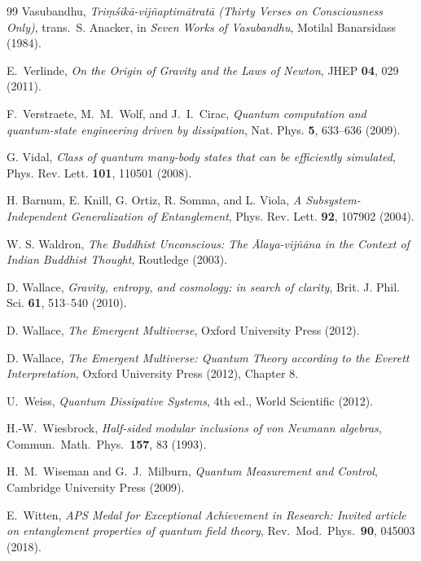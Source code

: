 \documentclass[12pt,a4paper,openany]{book}
\begin{document}
\begin{thebibliography}{99}
Vasubandhu, \emph{Triṃśikā-vijñaptimātratā (Thirty Verses on Consciousness Only)}, trans.\ S. Anacker, in \emph{Seven Works of Vasubandhu}, Motilal Banarsidass (1984).


E.~Verlinde, \emph{On the Origin of Gravity and the Laws of Newton}, JHEP \textbf{04}, 029 (2011).

F.~Verstraete, M.~M.~Wolf, and J.~I.~Cirac, \emph{Quantum computation and quantum-state engineering driven by dissipation}, Nat. Phys. \textbf{5}, 633--636 (2009).

G. Vidal, \emph{Class of quantum many-body states that can be efficiently simulated}, Phys. Rev. Lett. \textbf{101}, 110501 (2008).

H. Barnum, E. Knill, G. Ortiz, R. Somma, and L. Viola, \emph{A Subsystem-Independent Generalization of Entanglement}, Phys. Rev. Lett. \textbf{92}, 107902 (2004).

W. S. Waldron, \emph{The Buddhist Unconscious: The Ālaya-vijñāna in the Context of Indian Buddhist Thought}, Routledge (2003).

D. Wallace, \emph{Gravity, entropy, and cosmology: in search of clarity}, Brit. J. Phil. Sci. \textbf{61}, 513--540 (2010).

D. Wallace, \emph{The Emergent Multiverse}, Oxford University Press (2012).

D. Wallace, \emph{The Emergent Multiverse: Quantum Theory according to the Everett Interpretation}, Oxford University Press (2012), Chapter 8.

U.~Weiss, \emph{Quantum Dissipative Systems}, 4th ed., World Scientific (2012).

H.-W.~Wiesbrock,
\emph{Half-sided modular inclusions of von Neumann algebras},
Commun.\ Math.\ Phys.\ \textbf{157}, 83 (1993).

H.~M.~Wiseman and G.~J.~Milburn, \emph{Quantum Measurement and Control}, Cambridge University Press (2009).

E.~Witten, \emph{APS Medal for Exceptional Achievement in Research: Invited article on entanglement properties of quantum field theory}, Rev.\ Mod.\ Phys.\ \textbf{90}, 045003 (2018).


\end{thebibliography}
\end{document}
